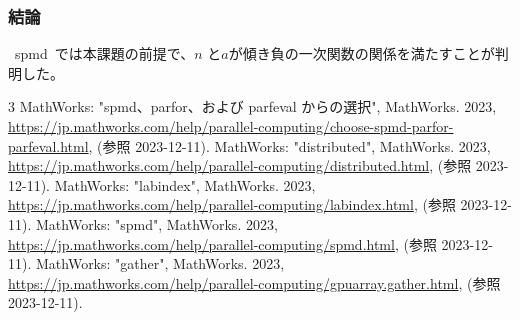 \documentclass[10pt]{jarticle}
\begin{document}
\subsubsection{結論}
%
\ spmd\ では本課題の前提で、$ n $ と$ a $が傾き負の一次関数の関係を満たすことが判明した。
%
\begin{thebibliography}{3}
    MathWorks: "spmd、parfor、および parfeval からの選択", MathWorks. 2023, \\
    \url{https://jp.mathworks.com/help/parallel-computing/choose-spmd-parfor-parfeval.html}, (参照 2023-12-11).
    MathWorks: "distributed", MathWorks. 2023, \\
    \url{https://jp.mathworks.com/help/parallel-computing/distributed.html}, (参照 2023-12-11).
    MathWorks: "labindex", MathWorks. 2023, \\
    \url{https://jp.mathworks.com/help/parallel-computing/labindex.html}, (参照 2023-12-11).
    MathWorks: "spmd", MathWorks. 2023, \\
    \url{https://jp.mathworks.com/help/parallel-computing/spmd.html}, (参照 2023-12-11).
    MathWorks: "gather", MathWorks. 2023, \\
    \url{https://jp.mathworks.com/help/parallel-computing/gpuarray.gather.html}, (参照 2023-12-11).
\end{thebibliography}
\end{document}
